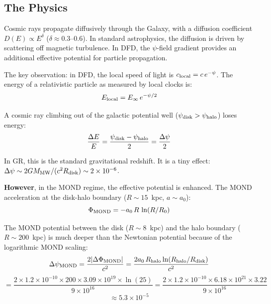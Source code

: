 \documentclass[11pt]{article}
\begin{document}
\subsection{The Physics}

Cosmic rays propagate diffusively through the Galaxy, with a diffusion
coefficient $D(E) \propto E^\delta$ ($\delta \approx 0.3$--$0.6$). In
standard astrophysics, the diffusion is driven by scattering off magnetic
turbulence. In DFD, the $\psi$-field gradient provides an additional
effective potential for particle propagation.

The key observation: in DFD, the local speed of light is
$c_{\rm local} = c\,e^{-\psi}$. The energy of a relativistic particle
as measured by local clocks is:
\begin{equation}
E_{\rm local} = E_\infty\,e^{-\psi/2}
\end{equation}

A cosmic ray climbing out of the galactic potential well ($\psi_{\rm disk}
> \psi_{\rm halo}$) loses energy:
\begin{equation}
\frac{\Delta E}{E} = \frac{\psi_{\rm disk} - \psi_{\rm halo}}{2}
= \frac{\Delta\psi}{2}
\end{equation}

In GR, this is the standard gravitational redshift. It is a tiny effect:
$\Delta\psi \sim 2GM_{\rm MW}/(c^2 R_{\rm disk}) \sim 2 \times 10^{-6}$.

\textbf{However}, in the MOND regime, the effective potential is enhanced.
The MOND acceleration at the disk-halo boundary ($R \sim 15$~kpc, $a \sim a_0$):
\begin{equation}
\Phi_{\rm MOND} = -a_0\,R\,\ln(R/R_0)
\end{equation}

The MOND potential between the disk ($R \sim 8$~kpc) and the halo boundary
($R \sim 200$~kpc) is much deeper than the Newtonian potential because of
the logarithmic MOND scaling:
\begin{equation}
\Delta\psi_{\rm MOND} = \frac{2|\Delta\Phi_{\rm MOND}|}{c^2}
= \frac{2a_0\,R_{\rm halo}\ln(R_{\rm halo}/R_{\rm disk})}{c^2}
\end{equation}
\begin{equation}
= \frac{2 \times 1.2 \times 10^{-10} \times 200 \times 3.09 \times 10^{19} \times \ln(25)}{9 \times 10^{16}}
= \frac{2 \times 1.2 \times 10^{-10} \times 6.18 \times 10^{21} \times 3.22}{9 \times 10^{16}}
\end{equation}
\begin{equation}
\approx 5.3 \times 10^{-5}
\end{equation}
\end{document}
